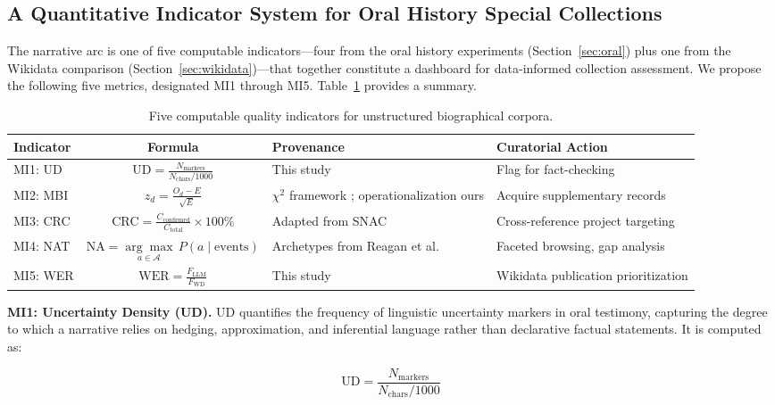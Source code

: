 \documentclass[review]{elsarticle}
\begin{document}
\subsection{A Quantitative Indicator System for Oral History Special Collections}

The narrative arc is one of five computable indicators---four from the oral history experiments (Section~\ref{sec:oral}) plus one from the Wikidata comparison (Section~\ref{sec:wikidata})---that together constitute a dashboard for data-informed collection assessment. We propose the following five metrics, designated MI1 through MI5. Table~\ref{tab:indicators} provides a summary.

\begin{table}[ht]
\centering
\caption{Five computable quality indicators for unstructured biographical corpora.}
\label{tab:indicators}
\begin{tabular}{lcll}
\toprule
Indicator & Formula & Provenance & Curatorial Action \\
\midrule
MI1: UD & $\text{UD} = \frac{N_{\text{markers}}}{N_{\text{chars}} / 1000}$ & This study & Flag for fact-checking \\
MI2: MBI & $z_d = \frac{O_d - E}{\sqrt{E}}$ & $\chi^2$ framework \cite{rubin1986autobiographical}; operationalization ours & Acquire supplementary records \\
MI3: CRC & $\text{CRC} = \frac{C_{\text{confirmed}}}{C_{\text{total}}} \times 100\%$ & Adapted from SNAC \cite{larson2015connecting} & Cross-reference project targeting \\
MI4: NAT & $\text{NA} = \underset{a \in \mathcal{A}}{\arg\max}\, P(a \mid \text{events})$  & Archetypes from Reagan et al.\ \cite{reagan2016emotional} & Faceted browsing, gap analysis \\
MI5: WER & $\text{WER} = \frac{F_{\text{LLM}}}{F_{\text{WD}}}$ & This study & Wikidata publication prioritization \\
\bottomrule
\end{tabular}
\end{table}

\textbf{MI1: Uncertainty Density (UD).} UD quantifies the frequency of linguistic uncertainty markers in oral testimony, capturing the degree to which a narrative relies on hedging, approximation, and inferential language rather than declarative factual statements. It is computed as:

\begin{equation}
\text{UD} = \frac{N_{\text{markers}}}{N_{\text{chars}} / 1000}
\end{equation}
\end{document}
